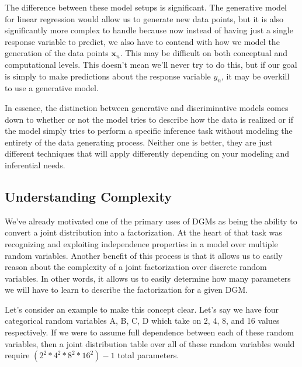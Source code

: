 The difference between these model setups is significant. The generative model for linear regression would allow us to generate new data points, but it is also significantly more complex to handle because now instead of having just a single response variable to predict, we also have to contend with how we model the generation of the data points $\textbf{x}_n$. This may be difficult on both conceptual and computational levels. This doesn't mean we'll never try to do this, but if our goal is simply to make predictions about the response variable $y_n$, it may be overkill to use a generative model.

In essence, the distinction between generative and discriminative models comes down to whether or not the model tries to describe how the data is realized or if the model simply tries to perform a specific inference task without modeling the entirety of the data generating process. Neither one is better, they are just different techniques that will apply differently depending on your modeling and inferential needs.

\subsection{Understanding Complexity}
We've already motivated one of the primary uses of DGMs as being the ability to convert a joint distribution into a factorization. At the heart of that task was recognizing and exploiting independence properties in a model over multiple random variables. Another benefit of this process is that it allows us to easily reason about the complexity of a joint factorization over discrete random variables. In other words, it allows us to easily determine how many parameters we will have to learn to describe the factorization for a given DGM.

Let's consider an example to make this concept clear. Let's say we have four categorical random variables A, B, C, D which take on 2, 4, 8, and 16 values respectively. If we were to assume full dependence between each of these random variables, then a joint distribution table over all of these random variables would require $(2^2 * 4^2 * 8^2 * 16^2) - 1$ total parameters.


